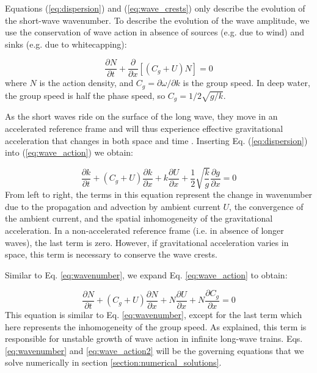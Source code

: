 \documentclass[draft]{agujournal2019}
\begin{document}
Equations (\ref{eq:dispersion}) and (\ref{eq:wave_crests}) only describe the
evolution of the short-wave wavenumber.
To describe the evolution of the wave amplitude, we use the conservation of wave
action in absence of sources (e.g. due to wind) and sinks (e.g. due to whitecapping):

\begin{equation}
\label{eq:wave_action}
\dfrac{\partial N}{\partial t}
+ \dfrac{\partial}{\partial x} \left[\left(C_g + U\right)N\right]
= 0
\end{equation}
where $N$ is the action density, and $C_g = \partial \omega / \partial k$ is the
group speed.
In deep water, the group speed is half the phase speed, so $C_g = 1/2\sqrt{g/k}$.

As the short waves ride on the surface of the long wave,
they move in an accelerated reference frame and will thus experience effective
gravitational acceleration that changes in both space and time \cite{longuet1986eulerian,longuet1987propagation}.
Inserting Eq. (\ref{eq:dispersion}) into (\ref{eq:wave_action}) we obtain:

\begin{equation}
\label{eq:wavenumber}
\dfrac{\partial k}{\partial t}
+ \left(C_g + U\right) \dfrac{\partial k}{\partial x}
+ k \dfrac{\partial U}{\partial x}
+ \dfrac{1}{2} \sqrt{\dfrac{k}{g}} \dfrac{\partial g}{\partial x}
= 0
\end{equation}
From left to right, the terms in this equation represent the change in wavenumber
due to the propagation and advection by ambient current $U$, the convergence of
the ambient current, and the spatial inhomogeneity of the gravitational acceleration.
In a non-accelerated reference frame (i.e. in absence of longer waves), the last
term is zero.
However, if gravitational acceleration varies in space, this term is necessary
to conserve the wave crests.

Similar to Eq. \ref{eq:wavenumber}, we expand Eq. \ref{eq:wave_action} to obtain:

\begin{equation}
\label{eq:wave_action2}
\dfrac{\partial N}{\partial t}
+ \left(C_g + U\right) \dfrac{\partial N}{\partial x}
+ N \dfrac{\partial U}{\partial x}
+ N \dfrac{\partial C_g}{\partial x}
= 0
\end{equation}
This equation is similar to Eq. \ref{eq:wavenumber}, except for the last term
which here represents the inhomogeneity of the group speed.
As  explained, this term is responsible for unstable
growth of wave action in infinite long-wave trains.
Eqs. \ref{eq:wavenumber} and \ref{eq:wave_action2} will be the governing equations
that we solve numerically in section \ref{section:numerical_solutions}.
\end{document}

